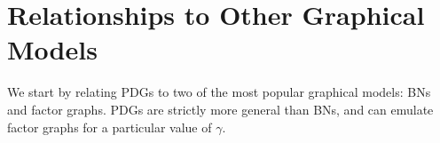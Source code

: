 \documentclass[letterpaper]{article} %
\theoremstyle{plain}
\theoremstyle{definition}
\theoremstyle{remark}
\newcommand\vfull[1]{{\color{vfullcolor} #1}}
\renewcommand\vfull[1]{} %
\begin{document}
\section{Relationships to Other Graphical Models}
\label{sec:other-graphical-models} 
We start by relating
PDGs to two of the most popular graphical models: BNs and factor
graphs. PDGs are strictly more general than BNs, and can emulate factor graphs
for a particular value of $\gamma$. 
\end{document}

